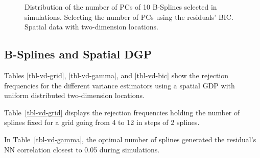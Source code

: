 \documentclass[
]{article}
\begin{document}
\begin{figure}

\begin{minipage}[t]{0.50\linewidth}

{\centering 


}

\end{minipage}%
%
\begin{minipage}[t]{0.50\linewidth}

{\centering 


}

\end{minipage}%

\caption{\label{fig-pc-bic-vd-spa}Distribution of the number of PCs of
10 B-Splines selected in simulations. Selecting the number of PCs using
the residuals' BIC. Spatial data with two-dimension locations.}

\end{figure}

\hypertarget{b-splines-and-spatial-dgp}{%
\subsection{B-Splines and Spatial DGP}\label{b-splines-and-spatial-dgp}}

Tables \ref{tbl-vd-grid}, \ref{tbl-vd-gamma}, and \ref{tbl-vd-bic} show
the rejection frequencies for the different variance estimators using a
spatial GDP with uniform distributed two-dimension locations.

Table~\ref{tbl-vd-grid} displays the rejection frequencies holding the
number of splines fixed for a grid going from 4 to 12 in steps of 2
splines.

In Table~\ref{tbl-vd-gamma}, the optimal number of splines generated the
residual's NN correlation closest to 0.05 during simulations.
\end{document}
